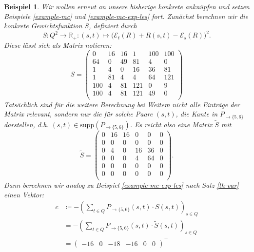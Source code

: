 \documentclass[a4paper]{article}
\newtheorem{beispiel}[satz]{Beispiel}
\theoremstyle{nonumberplain}
\begin{document}
\begin{beispiel}\label{example-mc-var-les}
	Wir wollen erneut an unsere bisherige konkrete \mc{} anknüpfen und setzen Beispiele \ref{example-mc} und \ref{example-mc-exp-les} fort.
	Zunächst berechnen wir die konkrete Gewichtsfunktion $S$, definiert durch
	\[
		S: Q^2 \to \mathbb{R}_+ : (s,t) \mapsto \big(\mathcal{E}_{t}(R) + R(s,t) - \mathcal{E}_{s}(R)\big)^2\text{.}
	\]
	Diese lässt sich als Matrix notieren:
	\begin{equation*}
	S = \begin{pmatrix}
			0 & 16 & 16 & 1 & 100 & 100 \\
			64 & 0 & 49 & 81 & 4 & 0 \\
			1 & 4 & 0 & 16 & 36 & 81 \\
			1 & 81 & 4 & 4 & 64 & 121 \\
			100 & 4 & 81 & 121 & 0 & 9 \\
			100 & 4 & 81 & 121 & 49 & 0 \\
		\end{pmatrix}
	\end{equation*}
	Tatsächlich sind für die weitere Berechnung bei Weitem nicht alle Einträge der Matrix relevant, sondern nur die für solche Paare $(s,t)$, die Kante in $P_{\rightarrow \{5,6\}}$ darstellen, d.h. $(s,t) \in \mathrm{supp}(P_{\rightarrow \{5,6\}})$. Es reicht also eine Matrix $\tilde{S}$ mit
	\begin{equation*}
		\tilde{S} = \begin{pmatrix}
			0 & 16 & 16 & 0 & 0 & 0 \\
			0 & 0 & 0 & 0 & 0 & 0 \\
			0 & 4 & 0 & 16 & 36 & 0 \\
			0 & 0 & 0 & 4 & 64 & 0 \\
			0 & 0 & 0 & 0 & 0 & 0 \\
			0 & 0 & 0 & 0 & 0 & 0 \\
		\end{pmatrix}\text{.}
	\end{equation*}
		Dann berechnen wir analog zu Beispiel \ref{example-mc-exp-les} nach Satz \ref{th-var} einen Vektor:
	\begin{align*}
	c &\coloneqq - \left(\sum_{t \in Q}{ P_{\rightarrow \{5,6\}}(s,t) \cdot S(s,t) }\right)_{s \in Q} \\
	&= - \left(\sum_{t \in Q}{ P_{\rightarrow \{5,6\}}(s,t) \cdot \tilde{S}(s,t) }\right)_{s \in Q} \\
	&= \begin{pmatrix} -16 & 0 & -18 & -16 & 0 & 0 \end{pmatrix}^\intercal

\end{align*}
\end{beispiel}
\end{document}
